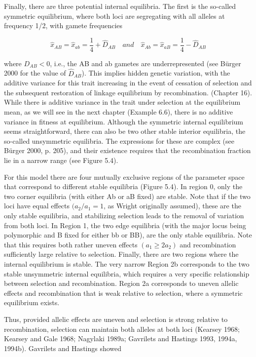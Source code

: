 \documentclass{article}
\begin{document}
Finally, there are three potential internal equilibria. The first is the so-called symmetric equilibrium, where both loci are segregating with all alleles at frequency 1/2, with gamete frequencies

\begin{equation}
\widehat{x}_{AB}=\widehat{x}_{ab}=\frac{1}{4}+\widehat{D}_{AB}\quad and\quad\widehat{x}_{Ab}=\widehat{x}_{aB}=\frac{1}{4}-\widehat{D}_{AB}
\end{equation}

where  $ D_{AB} < 0 $, i.e., the AB and ab gametes are underrepresented (see Bürger 2000 for the value of  $ \widehat{D}_{AB} $). This implies hidden genetic variation, with the additive variance for this trait increasing in the event of cessation of selection and the subsequent restoration of linkage equilibrium by recombination. (Chapter 16). While there is additive variance in the trait under selection at the equilibrium mean, as we will see in the next chapter (Example 6.6), there is no additive variance in fitness at equilibrium. Although the symmetric internal equilibrium seems straightforward, there can also be two other stable interior equilibria, the so-called unsymmetric equilibria. The expressions for these are complex (see Bürger 2000, p. 205), and their existence requires that the recombination fraction lie in a narrow range (see Figure 5.4).

For this model there are four mutually exclusive regions of the parameter space that correspond to different stable equilibria (Figure 5.4). In region 0, only the two corner equilibria (with either Ab or aB fixed) are stable. Note that if the two loci have equal effects  $ (a_2/a_1 = 1 $, as Wright originally assumed), these are the only stable equilibria, and stabilizing selection leads to the removal of variation from both loci. In Region 1, the two edge equilibria (with the major locus being polymorphic and B fixed for either bb or BB), are the only stable equilibria. Note that this requires both rather uneven effects  $ (a_1 \geq 2a_2) $ and recombination sufficiently large relative to selection. Finally, there are two regions where the internal equilibrium is stable. The very narrow Region 2b corresponds to the two stable unsymmetric internal equilibria, which requires a very specific relationship between selection and recombination. Region 2a corresponds to uneven allelic effects and recombination that is weak relative to selection, where a symmetric equilibrium exists.

Thus, provided allelic effects are uneven and selection is strong relative to recombination, selection can maintain both alleles at both loci (Kearsey 1968; Kearsey and Gale 1968; Nagylaki 1989a; Gavrilets and Hastings 1993, 1994a, 1994b). Gavrilets and Hastings showed
\end{document}
